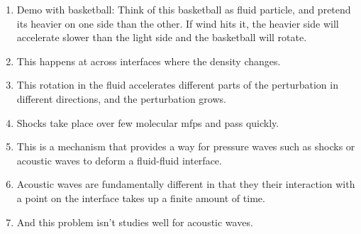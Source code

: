 \begin{frame}
{{\begin{enumerate}
        local rotation in the fluid. This is called baroclinic
        vorticity.
      \item Demo with basketball: Think of this basketball as fluid
        particle, and pretend its heavier on one side than the other.
        If wind hits it, the heavier side will accelerate slower than
        the light side and the basketball will rotate.
      \item This happens at across interfaces where the density changes.
      \item This rotation in the fluid accelerates different parts of
        the perturbation in different directions, and the
        perturbation grows.
      \item Shocks take place over few molecular mfps and pass quickly.
      \item This is a mechanism that provides a way for pressure waves
        such as shocks or acoustic waves to deform a fluid-fluid
        interface.
      \item Acoustic waves are fundamentally different in that they
        their interaction with a point on the interface takes up a
        finite amount of time.
      \item And this problem isn't studies well for acoustic waves.
      \end{enumerate}
      }
    }
  \end{frame}

